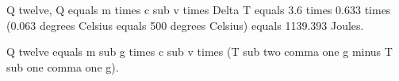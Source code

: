 Q twelve, Q equals m times c sub v times Delta T equals 3.6 times 0.633 times (0.063 degrees Celsius equals 500 degrees Celsius) equals 1139.393 Joules.

Q twelve equals m sub g times c sub v times (T sub two comma one g minus T sub one comma one g).